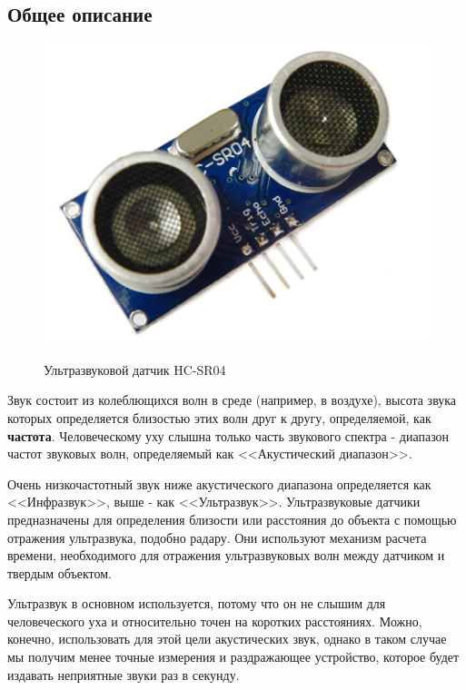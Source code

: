 \documentclass[a4paper, 14pt]{article}
\begin{document}
\subsection{Общее описание}

\begin{figure}[H]
	\centering
	\includegraphics[width=15cm]{screenshots/1.png}\\
	\caption{Ультразвуковой датчик HC-SR04}
\end{figure}

Звук состоит из колеблющихся волн в среде (например, в воздухе), высота звука которых определяется близостью этих волн друг к другу, определяемой, как \textbf{частота}. Человеческому уху слышна только часть звукового спектра - диапазон частот звуковых волн, определяемый как <<Акустический диапазон>>.

Очень низкочастотный звук ниже акустического диапазона определяется как <<Инфразвук>>, выше - как <<Ультразвук>>. Ультразвуковые датчики предназначены для определения близости или расстояния до объекта с помощью отражения ультразвука, подобно радару. Они используют механизм расчета времени, необходимого для отражения ультразвуковых волн между датчиком и твердым объектом.

Ультразвук в основном используется, потому что он не слышим для человеческого уха и относительно точен на коротких расстояниях. Можно, конечно, использовать для этой цели акустических звук, однако в таком случае мы получим менее точные измерения и раздражающее устройство, которое будет издавать неприятные звуки раз в секунду.
\end{document}
